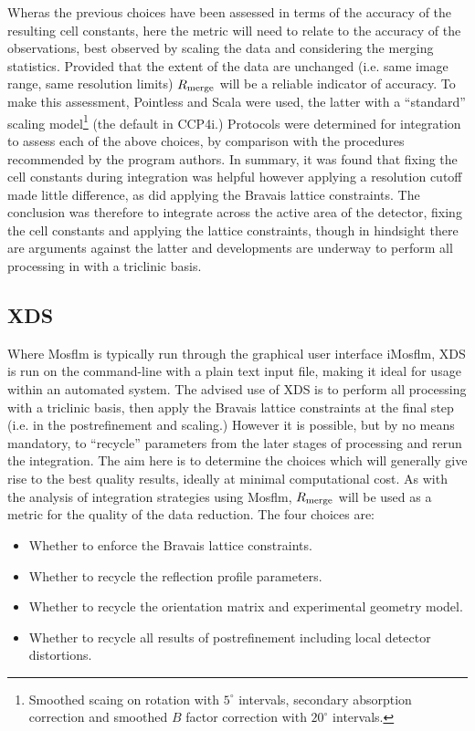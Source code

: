 \documentclass[preprint,pdf]{iucr}
\begin{document}
Wheras the previous choices have been assessed in terms of the accuracy
of the resulting cell constants, here the metric will need to relate
to the accuracy of the observations, best observed by scaling the data
and considering the merging statistics. Provided that the extent of
the data are unchanged (i.e. same image range, same resolution limits)
$R_{\rm{merge}}$ will be a reliable indicator of accuracy. To make
this assessment, Pointless \cite{Evans:ba5084} and Scala were
used, the latter with a ``standard'' scaling model\footnote{Smoothed
  scaing on rotation with $5^{\circ}$ intervals, secondary absorption
  correction and smoothed $B$ factor correction with $20^{\circ}$
  intervals.}
(the default in CCP4i.) Protocols were determined for integration to assess each
of the above choices, by comparison with the procedures recommended
by the program authors. In summary, it was found that fixing the cell
constants during integration was helpful however applying a resolution
cutoff made little difference, as did applying the Bravais lattice
constraints. The conclusion was therefore to integrate across the
active area of the detector, fixing the cell constants and applying
the lattice constraints, though in hindsight there are arguments
against the latter and developments are underway to perform all
processing in with a triclinic basis.

\subsection{XDS}

Where Mosflm is typically run through the graphical user interface
iMosflm, XDS is run on the command-line with a plain text input file,
making it ideal for usage 
within an automated system. The advised use of XDS is to perform all
processing with a triclinic basis, then apply the Bravais lattice
constraints at the final step (i.e. in the postrefinement and scaling.) However it
is possible, but by no means mandatory, to ``recycle'' parameters from
the later stages of processing and rerun the integration. The aim here
is to determine the choices which will generally give rise to the best
quality results, ideally at minimal computational cost. As with the
analysis of integration strategies using Mosflm, $R_{\rm{merge}}$ will
be used as a metric for the quality of the data reduction. The four
choices are:

\begin{itemize}
\item{Whether to enforce the Bravais lattice constraints.}
\item{Whether to recycle the reflection profile parameters.}
\item{Whether to recycle the orientation matrix and experimental
    geometry model.}
\item{Whether to recycle all results of postrefinement including local
    detector distortions.}
\end{itemize}
\end{document}
